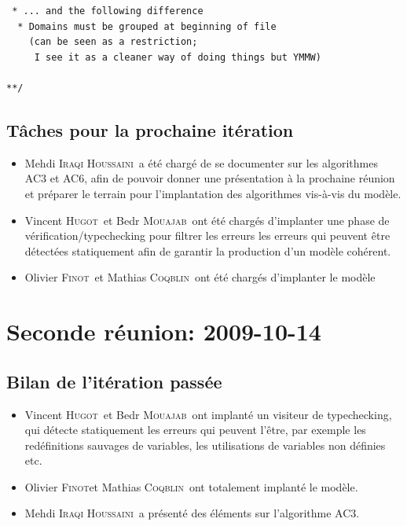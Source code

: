 \documentclass[a4paper,12pt]{article}
\def\familyname{\textsc}
\def\firstname#1{#1}
\def\groupmember#1#2{\firstname{#1} \familyname{#2}}
\def\mmat{\groupmember{Mathias}{Coqblin}}
\def\moli{\groupmember{Olivier}{Finot}}
\def\mvin{\groupmember{Vincent}{Hugot}}
\def\mmed{\groupmember{Mehdi}{Iraqi Houssaini}}
\def\mbed{\groupmember{Bedr}{Mouajab}}
\begin{document}
\begin{itemize}
\begin{verbatim}
 * ... and the following difference
  * Domains must be grouped at beginning of file
    (can be seen as a restriction; 
     I see it as a cleaner way of doing things but YMMW)
  
**/
\end{verbatim}
\end{itemize}



\subsection{Tâches pour la prochaine itération}

\begin{itemize}
 \item \mmed\ a été chargé de se documenter sur les algorithmes AC3 et AC6,
afin de pouvoir donner une présentation à la prochaine réunion et
préparer le terrain pour l'implantation des algorithmes vis-à-vis du 
modèle.
\item \mvin\ et \mbed\ ont été chargés d'implanter une phase de 
 vérification/typechecking pour filtrer les erreurs
 les erreurs qui peuvent être détectées statiquement afin
 de garantir la production d'un modèle cohérent.
\item \moli\ et \mmat\ ont été chargés d'implanter le modèle
\end{itemize}








\section{Seconde réunion: 2009-10-14}

\subsection{Bilan de l'itération passée}

\begin{itemize}
 \item \mvin\ et \mbed\ ont implanté un visiteur de typechecking, 
  qui détecte statiquement les erreurs qui peuvent l'être, 
  par exemple les redéfinitions sauvages de variables, les utilisations
  de variables non définies etc. 
\item \moli et \mmat\ ont totalement implanté le modèle.
\item \mmed\ a présenté des éléments sur l'algorithme AC3.
\end{itemize}
\end{document}
